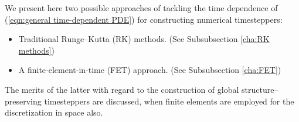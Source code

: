     \line
    
    We present here two possible approaches of tackling the time dependence of (\ref{eqn:general time-dependent PDE}) for constructing numerical timesteppers:
    \begin{itemize}
        \item  Traditional Runge--Kutta (RK) methods. (See Subsubsection \ref{cha:RK methods})
        \item  A finite-element-in-time (FET) approach. (See Subsubsection \ref{cha:FET})
    \end{itemize}
    The merits of the latter with regard to the construction of global structure--preserving timesteppers are discussed, when finite elements are employed for the discretization in space also.


    
    
